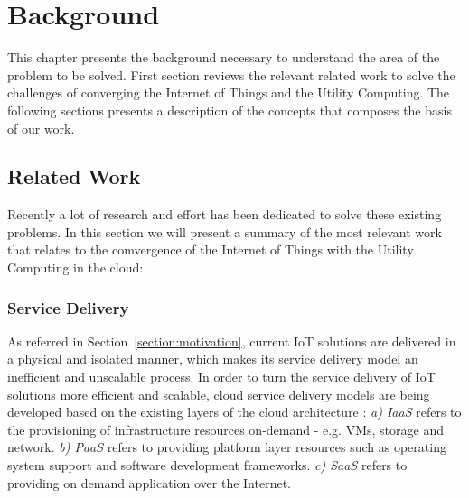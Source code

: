 
\chapter{Background}
\label{chapter:background}
This chapter presents the background necessary to understand the area of the problem to be solved.
First section reviews the relevant related work to solve the challenges of converging the Internet
of Things and the Utility Computing. The following sections presents a description of the concepts
that composes the basis of our work.

\section{Related Work}
\label{section:related_work}
Recently a lot of research and effort has been dedicated to solve these existing problems. In this
section we will present a summary of the most relevant work that relates to the comvergence of the
Internet of Things with the Utility Computing in the cloud:

\subsection{Service Delivery}
\label{sub:service_delivery}
As referred in Section~\ref{section:motivation}, current \gls{IoT} solutions are delivered in a physical
and isolated manner, which makes its service delivery model an inefficient and unscalable process.
In order to turn the service delivery of \gls{IoT} solutions more efficient and scalable, cloud service
delivery models are being developed based on the existing layers of the cloud architecture \cite{zhang2010cloud}:
\textit{a) \gls{IaaS}} refers to the provisioning of infrastructure resources on-demand - e.g. \glspl{VM},
storage and network. \textit{b) \gls{PaaS}} refers to providing platform layer resources such as operating
system support and software development frameworks. \textit{c) \gls{SaaS}} refers to providing on demand
application over the Internet.


